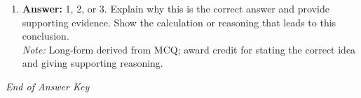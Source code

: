 \documentclass[12pt]{article}
\begin{document}
\begin{enumerate}[label=\arabic*.]
\\ \textit{Note:} Students should show all steps in their mathematical solution.
\item \textbf{Answer:} 1, 2, or 3. Explain why this is the correct answer and provide supporting evidence. Show the calculation or reasoning that leads to this conclusion.
\\ \textit{Note:} Long-form derived from MCQ; award credit for stating the correct idea and giving supporting reasoning.
\end{enumerate}

\vfill
\noindent\textit{End of Answer Key}
\end{document}
